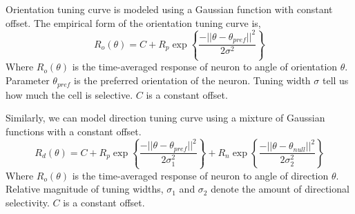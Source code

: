 \documentclass[MTech]{iitmdiss}
\begin{document}
Orientation tuning curve is modeled using a Gaussian function with constant offset. The empirical form of the orientation tuning curve is,
$$R_o(\theta) = C + R_p \exp\left\{\frac{-||\theta-\theta_{pref}||^2}{2\sigma^2}\right\}$$
Where $R_o(\theta)$ is the time-averaged response of neuron to angle of orientation $\theta$. Parameter $\theta_{pref}$ is the preferred orientation of the neuron. Tuning width $\sigma$  tell us how much the cell is selective. $C$ is a constant offset.

Similarly, we can model direction tuning curve using a mixture of Gaussian functions with a constant offset. 
$$R_d(\theta) = C + R_p \exp\left\{\frac{-||\theta-\theta_{pref}||^2}{2\sigma_1^2}\right\} + R_n \exp\left\{\frac{-||\theta-\theta_{null}||^2}{2\sigma_2^2}\right\}$$
Where $R_o(\theta)$ is the time-averaged response of neuron to angle of direction $\theta$. Relative magnitude of tuning widths, $\sigma_1$ and $\sigma_2$ denote the amount of directional selectivity. $C$ is a constant offset.
\end{document}
